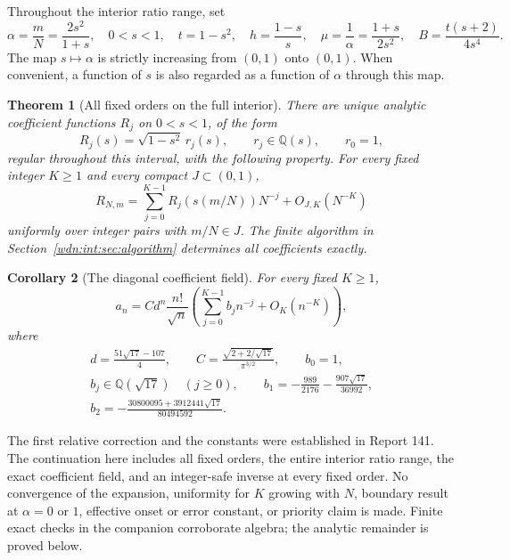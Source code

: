 \documentclass[11pt,letterpaper]{article}
\newtheorem{theorem}{Theorem}[section]
\newtheorem{corollary}[theorem]{Corollary}
\theoremstyle{remark}\newtheorem{remark}[theorem]{Remark}
\newcommand{\Q}{\mathbb Q}
\begin{document}
Throughout the interior ratio range, set
\begin{equation}\label{wdn:int:eq:saddleparameters}
 \alpha=\frac mN=\frac{2s^2}{1+s},\quad 0<s<1,\quad
 t=1-s^2,\quad h=\frac{1-s}{s},\quad
 \mu=\frac1\alpha=\frac{1+s}{2s^2},\quad
 B=\frac{t(s+2)}{4s^4}.
\end{equation}
The map $s\mapsto\alpha$ is strictly increasing from $(0,1)$ onto $(0,1)$.
When convenient, a function of $s$ is also regarded as a function of
$\alpha$ through this map.

\begin{theorem}[All fixed orders on the full interior]\label{wdn:int:thm:allorders}
There are unique analytic coefficient functions $R_j$ on $0<s<1$, of the
form
\begin{equation}\label{wdn:int:eq:rationalform}
 R_j(s)=\sqrt{1-s^2}\,r_j(s),\qquad r_j\in\Q(s),\qquad r_0=1,
\end{equation}
regular throughout this interval, with the following property. For every
fixed integer $K\ge1$ and every compact $J\subset(0,1)$,
\begin{equation}\label{wdn:int:eq:allorders}
 R_{N,m}=\sum_{j=0}^{K-1}R_j(s(m/N))N^{-j}
                  +O_{J,K}(N^{-K})
\end{equation}
uniformly over integer pairs with $m/N\in J$. The finite algorithm in
Section~\ref{wdn:int:sec:algorithm} determines all coefficients exactly.
\end{theorem}

\begin{corollary}[The diagonal coefficient field]\label{wdn:int:cor:diagonal}
For every fixed $K\ge1$,
\begin{equation}\label{wdn:int:eq:diagonal}
 a_n=C d^n\frac{n!}{\sqrt n}
 \left(\sum_{j=0}^{K-1}b_jn^{-j}+O_K(n^{-K})\right),
\end{equation}
where
\begin{gather}
 d=\frac{51\sqrt{17}-107}{4},\qquad
 C=\frac{\sqrt{2+2/\sqrt{17}}}{\pi^{3/2}},\qquad b_0=1,\label{wdn:int:eq:constants}\\
 b_j\in\Q(\sqrt{17})\quad(j\ge0),\qquad
 b_1=-\frac{989}{2176}-\frac{907\sqrt{17}}{36992},\label{wdn:int:eq:b1}\\
 b_2=-\frac{30800095+3912441\sqrt{17}}{80494592}.
 \label{wdn:int:eq:b2}
\end{gather}
\end{corollary}
The first relative correction and the constants were established in
Report 141. The continuation here includes all fixed orders, the entire
interior ratio range, the exact coefficient field, and an integer-safe
inverse at every fixed order. No convergence of the expansion, uniformity
for $K$ growing with $N$, boundary result at $\alpha=0$ or $1$, effective
onset or error constant, or priority claim is made. Finite exact checks
in the companion corroborate algebra; the analytic remainder is proved
below.
\end{document}
